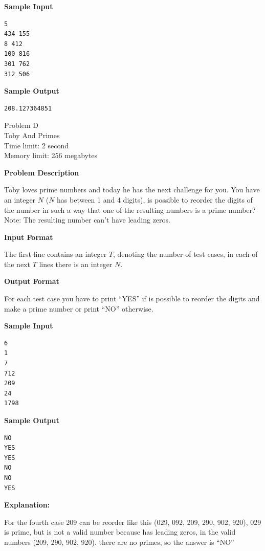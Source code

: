 \documentclass[11pt]{article}
\begin{document}
\textbf{\large Sample Input}

\begin{verbatim}
5
434 155
8 412
100 816
301 762
312 506
\end{verbatim}

\textbf{\large Sample Output}

\begin{verbatim}
208.127364851
\end{verbatim}

\newpage
        \begin{center}
            {\LARGE Problem D}\\
            {\Large Toby And Primes}\\
            {Time limit: 2 second}\\
            {Memory limit: 256 megabytes}
        \end{center}\textbf{\large Problem Description}

Toby loves prime numbers and today he has the next challenge for you.
You have an integer $N$ ($N$ has between 1 and 4 digits), is possible to reorder the
digits of the number in such a way that one of the resulting numbers is a prime number?
Note: The resulting number can't have leading zeros.

\textbf{\large Input Format}

The first line contains an integer $T$, denoting the number of test cases, in each of
the next $T$ lines there is an integer $N$.

\textbf{\large Output Format}

For each test case you have to print ``YES'' if is possible to reorder the digits and make
a prime number or print ``NO'' otherwise.

\textbf{\large Sample Input}

\begin{verbatim}
6
1
7
712
209
24
1798
\end{verbatim}

\textbf{\large Sample Output}

\begin{verbatim}
NO
YES
YES
NO
NO
YES
\end{verbatim}

\textbf{\large Explanation:}

For the fourth case 209 can be reorder like this (029, 092, 209, 290, 902, 920), 029 is prime,
but is not a valid number because has leading zeros, in the valid numbers (209, 290, 902, 920).
there are no primes, so the answer is ``NO''
\end{document}
